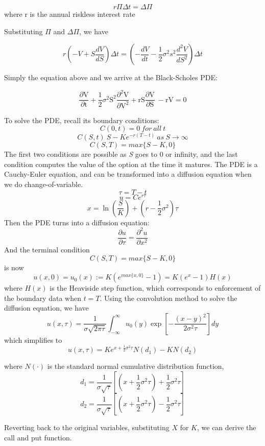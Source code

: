 \[ r \Pi \Delta t = \Delta \Pi \] where r is the annual riskless interest rate 

Substituting $\Pi$ and $\Delta \Pi$, we have 

\[ r\left(-V + S\frac{dV}{dS}\right)\Delta t = \left(- \frac{dV}{dt} - \frac{1}{2} \sigma^2 s^2 \frac{d^2V}{dS^2}\right)\Delta t\]


Simply the equation above and we arrive at the Black-Scholes PDE: 

\begin{equation}
	\frac{\partial \mathrm V}{ \partial \mathrm t } + \frac{1}{2}\sigma^{2} \mathrm S^{2} \frac{\partial^{2} \mathrm V}{\partial \mathrm V^2}
	+ \mathrm r \mathrm S \frac{\partial \mathrm V}{\partial \mathrm S}\ -
	\mathrm r \mathrm V = 0 
\end{equation}

To solve the PDE, recall its boundary conditions:
\[C(0,t) = 0\: for\: all\: t\]
\[C(S,t) ~ S-Ke^{-r(T-t)} \:as\: S\rightarrow\infty\]
\[C(S,T) = max\{S-K,0\}\]
The first two conditions are possible as \textit{S} goes to 0 or infinity, and the last condition computes the value of the option at the time it matures. 
\newline
The PDE is a Cauchy-Euler equation, and can be transformed into a diffusion equation when we do change-of-variable.
\[\tau = T-t\]
\[u=Ce^{r\tau}\]
\[x=\ln\left(\frac{S}{K}\right)+(r-\frac{1}{2}\sigma^2)\tau\]
Then the PDE turns into a diffusion equation:
\[\frac{\partial u}{\partial \tau} = \frac{\partial^2u}{\partial x^2}\]
And the terminal condition 
\[C(S,T)=max\{S-K,0\}\] is now
\[u(x,0)=u_0(x):=K(e^{max\{x,0\}}-1)=K(e^x-1)H(x)\]
where $H(x)$ is the Heaviside step function, which corresponds to enforcement of the boundary data when $t=T$.
Using the convolution method to solve the diffusion equation, we have
\[u(x,\tau) = \frac{1}{\sigma\sqrt{2\pi\tau}} \int_{-\infty}^{\infty}u_0(y)\exp\left[-\frac{(x-y)^2}{2\sigma^2\tau}\right]dy\]
which simplifies to 
\[u(x,\tau)=Ke^{x+\frac{1}{2}\sigma^2\tau}N(d_1)-KN(d_2)\]

where $N(\cdot)$ is the standard normal cumulative distribution function,
\[d_1 = \frac{1}{\sigma\sqrt{\tau}}\left[\left(x+\frac{1}{2}\sigma^2\tau\right)+\frac{1}{2}\sigma^2\tau\right]\]
\[d_2 = \frac{1}{\sigma\sqrt{\tau}}\left[\left(x+\frac{1}{2}\sigma^2\tau\right)-\frac{1}{2}\sigma^2\tau\right]\]

Reverting back to the original variables, substituting $X$ for $K$, we can derive the call and put function.
\\

